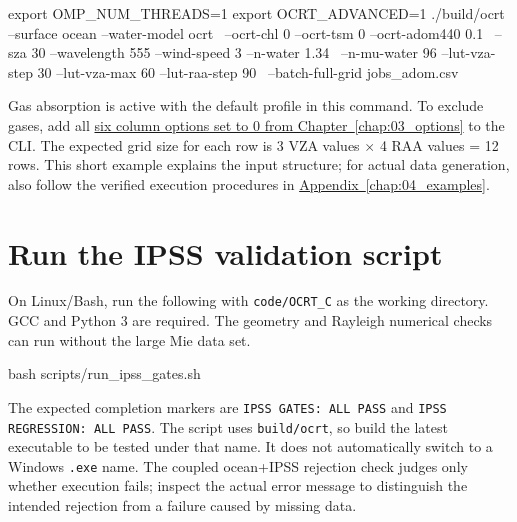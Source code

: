 \par\noindent\begin{minipage}{\linewidth}
\begin{ManualCode}
export OMP_NUM_THREADS=1
export OCRT_ADVANCED=1
./build/ocrt --surface ocean --water-model ocrt \
  --ocrt-chl 0 --ocrt-tsm 0 --ocrt-adom440 0.1 \
  --sza 30 --wavelength 555 --wind-speed 3 --n-water 1.34 \
  --n-mu-water 96 --lut-vza-step 30 --lut-vza-max 60 --lut-raa-step 90 \
  --batch-full-grid jobs_adom.csv
\end{ManualCode}
\end{minipage}\par

Gas absorption is active with the default profile in this command. To exclude gases, add all \hyperref[chap:03_options]{six column options set to 0 from Chapter~\ref*{chap:03_options}} to the CLI. The expected grid size for each row is 3 VZA values \ensuremath{\times} 4 RAA values = 12 rows. This short example explains the input structure; for actual data generation, also follow the verified execution procedures in \hyperref[chap:04_examples]{Appendix~\ref*{chap:04_examples}}.

\section{Run the IPSS validation script}
\label{sec:auto:04_examples:17}
\label{sec:example_ipss_gates}

On Linux/Bash, run the following with \texttt{code/\allowbreak{}OCRT\_\allowbreak{}C} as the working directory. GCC and Python 3 are required. The geometry and Rayleigh numerical checks can run without the large Mie data set.


\par\noindent\begin{minipage}{\linewidth}
\begin{ManualCode}
bash scripts/run_ipss_gates.sh
\end{ManualCode}
\end{minipage}\par

The expected completion markers are \texttt{IPSS GATES:\allowbreak{} ALL PASS} and \texttt{IPSS REGRESSION:\allowbreak{} ALL PASS}. The script uses \texttt{build/\allowbreak{}ocrt}, so build the latest executable to be tested under that name. It does not automatically switch to a Windows \texttt{.\allowbreak{}exe} name. The coupled ocean+IPSS rejection check judges only whether execution fails; inspect the actual error message to distinguish the intended rejection from a failure caused by missing data.
